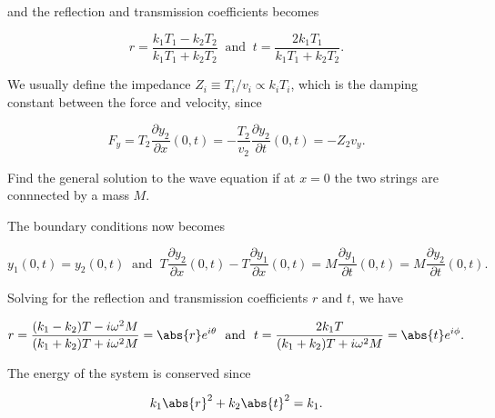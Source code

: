 \documentclass[a4paper,12pt]{report}
\begin{document}
{and the reflection and transmission coefficients becomes

\begin{equation}
	r = \frac{k_1T_1  - k_2T_2  }{k_1T_1  + k_2T_2  } ~\text { and }~ t = \frac{2 k_1T_1  }{k_1T_1  + k_2T_2  }.
\end{equation}

We usually define the impedance \(Z_{i} \equiv T_{i} / v_{i} \propto k_{i} T_{i}   \), which is the damping constant between the force and velocity, since

\begin{equation}
	F_{y} = T_{2}\frac{\partial y_{2} }{\partial x}(0,t) = -\frac{T_{2}}{v_{2} }\frac{\partial y_{2} }{\partial t}(0,t) = - Z_{2}v_{y}.    
\end{equation}

} 

{Find the general solution to the wave equation if at \(x=0\) the two strings are connnected by a mass \(M\).}
{The boundary conditions now becomes

\begin{equation}
	y_1 (0,t) = y_2 (0,t) ~\text { and }~ T\frac{\partial y_2 }{\partial x}(0,t) - T\frac{\partial y_1 }{\partial x}(0,t) = M \frac{\partial y_1 }{\partial t}(0,t)=M \frac{\partial y_2 }{\partial t}(0,t).    
\end{equation}

Solving for the reflection and transmission coefficients \(r \text { and } t\), we have

\begin{equation}
	r = \frac{(k_1 -k_2 )T-i \omega ^2M}{(k_1 +k_2 )T+i \omega ^2M} = \abs{r}e^{i \theta } ~\text { and }~ t = \frac{2 k_1 T}{(k_1 +k_2 )T + i \omega ^2M} = \abs{t} e^{i \phi  }.  
\end{equation}

The energy of the system is conserved since 

\begin{equation}
	k_{1} \abs{r} ^2+ k_{2} \abs{t} ^2 = k_{1} . 
\end{equation}
} 
\end{document}
